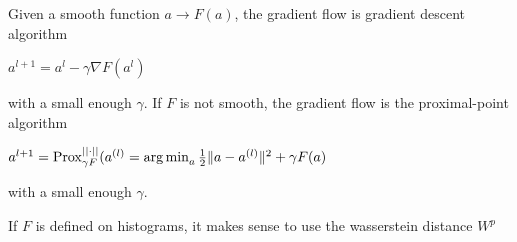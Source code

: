 Given a smooth function $a \rightarrow F(a)$, the gradient flow is gradient descent algorithm

$a^{l+1} = a^l - \gamma \nabla F(a^l)$

with a small enough $\gamma$. If $F$ is not smooth, the gradient flow is the proximal-point algorithm

$a^{l+1} = \operatorname{Prox}^{||\cdot ||}_{\gamma F}(a^{(l)} = \operatorname*{arg\,min}_a \frac{1}{2} \lVert a - a^{(l)}\rVert^2 + \gamma F(a)$

with a small enough $\gamma$.

If $F$ is defined on histograms, it makes sense to use the wasserstein distance $W^p$


%
